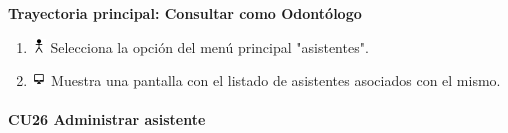 \textbf{Trayectoria principal: Consultar como Odontólogo}
\begin{enumerate}
\item \includegraphics[height=1em]{pictures/actor.png} Selecciona la opción del menú principal "asistentes".
\item \includegraphics[height=1em]{pictures/sistema.png} Muestra una pantalla con el listado de asistentes asociados con el mismo.
\end{enumerate} \bigskip



\paragraph{CU26 Administrar asistente}

